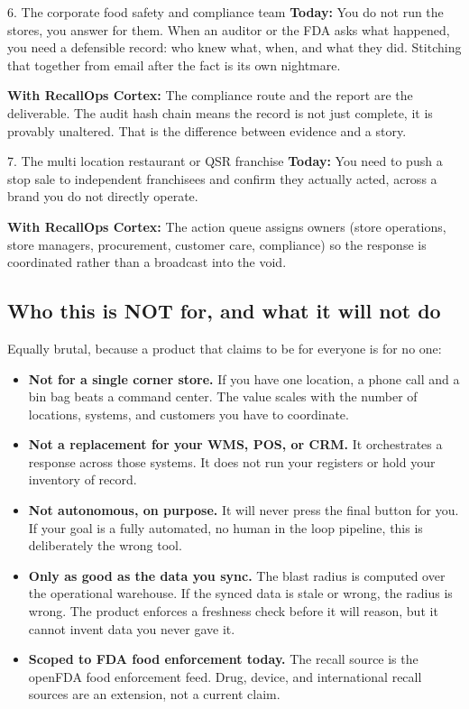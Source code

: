 \documentclass[11pt]{article}
\begin{document}
\begin{usecase}{6. The corporate food safety and compliance team}
\textbf{Today:} You do not run the stores, you answer for them. When an auditor or the FDA asks
what happened, you need a defensible record: who knew what, when, and what they did. Stitching that
together from email after the fact is its own nightmare.

\textbf{With RecallOps Cortex:} The compliance route and the report are the deliverable. The audit
hash chain means the record is not just complete, it is provably unaltered. That is the difference
between evidence and a story.
\end{usecase}

\begin{usecase}{7. The multi location restaurant or QSR franchise}
\textbf{Today:} You need to push a stop sale to independent franchisees and confirm they actually
acted, across a brand you do not directly operate.

\textbf{With RecallOps Cortex:} The action queue assigns owners (store operations, store managers,
procurement, customer care, compliance) so the response is coordinated rather than a broadcast into
the void.
\end{usecase}

\subsection{Who this is NOT for, and what it will not do}

Equally brutal, because a product that claims to be for everyone is for no one:

\begin{itemize}
\item \textbf{Not for a single corner store.} If you have one location, a phone call and a bin bag
beats a command center. The value scales with the number of locations, systems, and customers you
have to coordinate.
\item \textbf{Not a replacement for your WMS, POS, or CRM.} It orchestrates a response across those
systems. It does not run your registers or hold your inventory of record.
\item \textbf{Not autonomous, on purpose.} It will never press the final button for you. If your
goal is a fully automated, no human in the loop pipeline, this is deliberately the wrong tool.
\item \textbf{Only as good as the data you sync.} The blast radius is computed over the operational
warehouse. If the synced data is stale or wrong, the radius is wrong. The product enforces a
freshness check before it will reason, but it cannot invent data you never gave it.
\item \textbf{Scoped to FDA food enforcement today.} The recall source is the openFDA food
enforcement feed. Drug, device, and international recall sources are an extension, not a current
claim.
\end{itemize}
\end{document}
